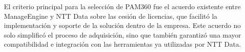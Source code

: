 El criterio principal para la selección de PAM360 fue el acuerdo existente entre ManageEngine y NTT Data sobre las cesión de licencias, que facilitó la implementación y soporte de la solución dentro de la empresa. Este acuerdo no solo simplificó el proceso de adquisición, sino que también garantizó una mayor compatibilidad e integración con las herramientas ya utilizadas por NTT Data.


